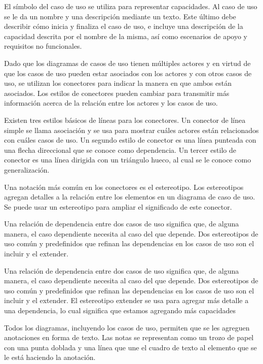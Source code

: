 \documentclass[12pt]{article}
\begin{document}
\begin{enumerate}
    El símbolo del caso de uso se utiliza para representar capacidades. Al caso de uso se le da un nombre y una descripción mediante un texto. Este último debe describir cómo inicia y finaliza el caso de uso, e incluye una descripción de la capacidad descrita por el nombre de la misma, así como escenarios de apoyo y requisitos no funcionales.

    Dado que los diagramas de casos de uso tienen múltiples actores y en virtud de que los casos de uso pueden estar asociados con los actores y con otros casos de uso, se utilizan los conectores para indicar la manera en que ambos están asociados. Los estilos de conectores pueden cambiar para transmitir más información acerca de la relación entre los actores y los casos de uso.

    Existen tres estilos básicos de líneas para los conectores. Un conector de línea simple se llama asociación y se usa para mostrar cuáles actores están relacionados con cuáles casos de uso. Un segundo estilo de conector es una línea punteada con una flecha direccional que se conoce como dependencia. Un tercer estilo de conector es una línea dirigida con un triángulo hueco, al cual se le conoce como generalización.

    Una notación más común en los conectores es el estereotipo. Los estereotipos agregan detalles a la relación entre los elementos en un diagrama de caso de uso. Se puede usar un estereotipo para ampliar el significado de este conector.

    Una relación de dependencia entre dos casos de uso significa que, de alguna manera, el caso dependiente necesita al caso del que depende. Dos estereotipos de uso común y predefinidos que refinan las dependencias en los casos de uso son el incluir y el extender.

    Una relación de dependencia entre dos casos de uso significa que, de alguna manera, el caso dependiente necesita al caso del que depende. Dos estereotipos de uso común y predefinidos que refinan las dependencias en los casos de uso son el incluir y el extender. El estereotipo extender se usa para agregar más detalle a una dependencia, lo cual significa que estamos agregando más capacidades

    Todos los diagramas, incluyendo los casos de uso, permiten que se les agreguen anotaciones en forma de texto. Las notas se representan como un trozo de papel con una punta doblada y una línea que une el cuadro de texto al elemento que se le está haciendo la anotación.


\end{enumerate}
\end{document}
